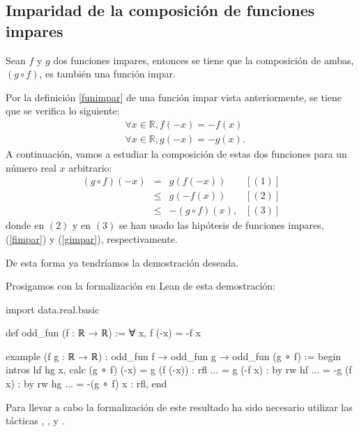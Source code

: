\subsection{Imparidad de la composición de funciones impares}

\begin{teorema}
  Sean \(f\) y \(g\) dos funciones impares, entonces se tiene que la
  composición de ambas, \((g ∘ f)\), es también una función impar.
\end{teorema}

\begin{demostracion}
  Por la definición \ref{funimpar} de una función impar vista
  anteriormente, se tiene que se verifica lo siguiente:
  \begin{align}
    & ∀ x ∈ ℝ, f(-x) = -f(x)  \label{fimpar} \\
    & ∀ x ∈ ℝ, g(-x) = -g(x). \label{gimpar}
  \end{align}
  A continuación, vamos a estudiar la composición de estas dos funciones
  para un número real \(x\) arbitrario:
  \[\begin{array}{llll}
      (g ∘ f)(-x) &= &g(f(-x))     & [(1)]\\
                  &≤ &g(-f(x))     & [(2)] \\
                  &≤ &-(g ∘ f)(x), & [(3)]
    \end{array}\]
  donde en \((2)\) y en \((3)\) se han usado las hipótesis de funciones
  impares, (\ref{fimpar}) y (\ref{gimpar}), respectivamente.

  De esta forma ya tendríamos la demostración deseada.
\end{demostracion}

Prosigamos con la formalización en Lean de esta demostración:
\begin{leancode}
import data.real.basic

def odd_fun (f : ℝ → ℝ) := ∀ x, f (-x) = -f x

example
  (f g : ℝ → ℝ)
  : odd_fun f → odd_fun g →  odd_fun (g ∘ f) :=
begin
  intros hf hg x,
  calc (g ∘ f) (-x)
      =  g (f (-x)) : rfl
  ... =  g (-f x)   : by rw hf
  ... = -g (f x)    : by rw hg
  ... =  -(g ∘ f) x : rfl,
end
\end{leancode}

Para llevar a cabo la formalización de este resultado ha sido necesario
utilizar las tácticas
,
,
 y
.


